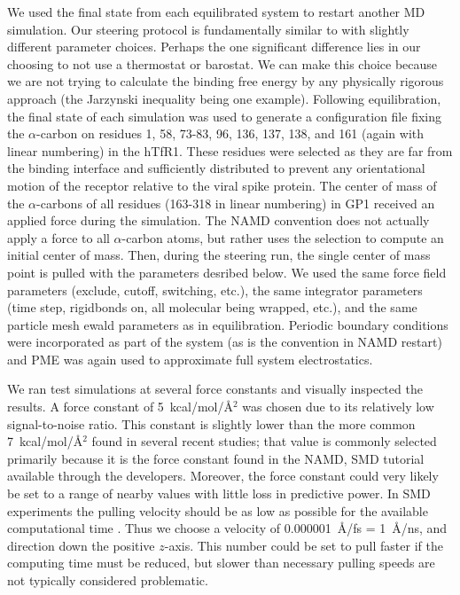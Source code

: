 \documentclass[12pt]{article}
\begin{document}
We used the final state from each equilibrated system to restart another MD simulation. Our steering protocol is fundamentally similar to \citet{Cuendet2008} with slightly different parameter choices. Perhaps the one significant difference lies in our choosing to not use a thermostat or barostat. We can make this choice because we are not trying to calculate the binding free energy by any physically rigorous approach (the Jarzynski inequality being one example). Following equilibration, the final state of each simulation was used to generate a configuration file fixing the $\alpha$-carbon on residues 1, 58, 73-83, 96, 136, 137, 138, and 161 (again with linear numbering) in the hTfR1. These residues were selected as they are far from the binding interface and sufficiently distributed to prevent any orientational motion of the receptor relative to the viral spike protein. The center of mass of the $\alpha$-carbons of all residues (163-318 in linear numbering) in GP1 received an applied force during the simulation. The NAMD convention does not actually apply a force to all $\alpha$-carbon atoms, but rather uses the selection to compute an initial center of mass. Then, during the steering run, the single center of mass point is pulled with the parameters desribed below. We used the same force field parameters (exclude, cutoff, switching, etc.), the same integrator parameters (time step, rigidbonds on, all molecular being wrapped, etc.), and the same particle mesh ewald parameters as in equilibration. Periodic boundary conditions were incorporated as part of the system (as is the convention in NAMD restart) and PME was again used to approximate full system electrostatics. 

We ran test simulations at several force constants and visually inspected the results. A force constant of 5~kcal/mol/\AA$^2$ was chosen due to its relatively low signal-to-noise ratio. This constant is slightly lower than the more common 7~kcal/mol/\AA$^2$ found in several recent studies; that value is commonly selected primarily because it is the force constant found in the NAMD, SMD tutorial available through the developers. Moreover, the force constant could very likely be set to a range of nearby values with little loss in predictive power. In SMD experiments the pulling velocity should be as low as possible for the available computational time \citet{Cuendet2008,Cuendet2011}. Thus we choose a velocity of 0.000001~\AA/fs = 1~\AA/ns, and direction down the positive $z$-axis. This number could be set to pull faster if the computing time must be reduced, but slower than necessary pulling speeds are not typically considered problematic. 
\end{document}
